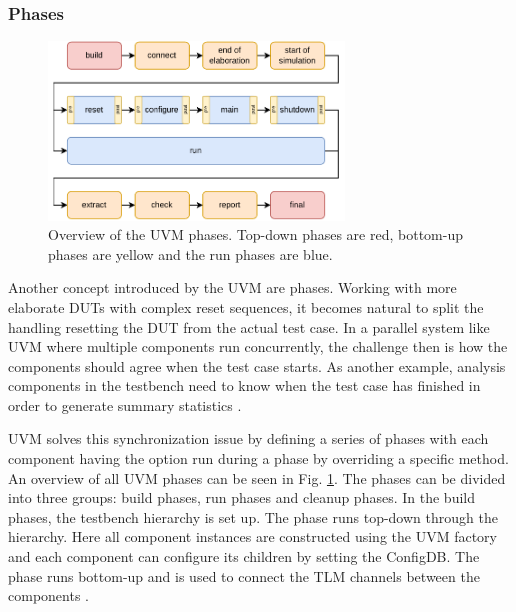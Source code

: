 \subsubsection{Phases} %

\begin{figure}
  \centering
  \includegraphics[width=0.7\textwidth]{diagrams/phases.pdf}
  \caption{Overview of the UVM phases. Top-down phases are red, bottom-up phases are yellow and the run phases are blue.}
  \label{fig:uvm_phases}
\end{figure}

Another concept introduced by the UVM are phases. Working with more elaborate DUTs with complex reset sequences, it
becomes natural to split the handling resetting the DUT from the actual test case. In a parallel system like UVM
where multiple components run concurrently, the challenge then is how the components should agree when the test case
starts. As another example, analysis components in the testbench need to know when the test case has finished in
order to generate summary statistics \cite[ch. 4.6]{mehta2018asic}.

UVM solves this synchronization issue by defining a series of phases with each component having the option run during
a phase by overriding a specific method. An overview of all UVM phases can be seen in Fig. \ref{fig:uvm_phases}. The
phases can be divided into three groups: build phases, run phases and cleanup phases. In the build phases, the
testbench hierarchy is set up. The  phase runs top-down through the hierarchy. Here all component
instances are constructed using the UVM factory and each component can configure its children by setting the
ConfigDB. The  phase runs bottom-up and is used to connect the TLM channels between the components
\cite[ch. 4.6]{mehta2018asic}.

